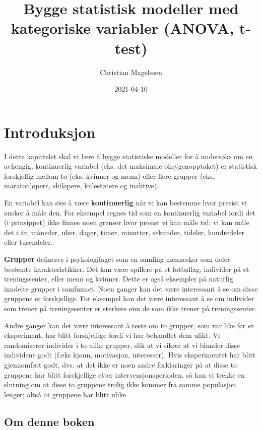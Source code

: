 \documentclass[
]{book}
\title{Bygge statistisk modeller med kategoriske variabler (ANOVA, t-test)}
\author{Christian Magelssen}
\date{2021-04-10}
\begin{document}
\maketitle

{
\setcounter{tocdepth}{1}
\tableofcontents
}
\hypertarget{intro}{%
\chapter{Introduksjon}\label{intro}}

I dette kapittelet skal vi lære å bygge statistiske modeller for å undersøke om en avhengig, kontinuerlig variabel (eks. det maksimale oksygenopptaket) er statistisk forskjellig mellom to (eks. kvinner og menn) eller flere grupper (eks. maratonløpere, skiløpere, kulestøtere og inaktive).

En variabel kan sies å være \textbf{kontinuerlig} når vi kan bestemme hvor presist vi ønsker å måle den. For eksempel regnes tid som en kontinuerlig variabel fordi det (i prinsippet) ikke finnes noen grenser hvor presist vi kan måle tid; vi kan måle det i år, måneder, uker, dager, timer, minutter, sekunder, tideler, hundredeler eller tusendeler.

\textbf{Grupper} defineres i psykologifaget som en samling mennesker som deler bestemte karakteristikker. Det kan være spillere på et fotballag, individer på et treningssenter, eller menn og kvinner. Dette er også eksempler på naturlig inndelte grupper i samfunnet. Noen ganger kan det være interessant å se om disse gruppene er forskjellige. For eksempel kan det være interessant å se om individer som trener på treningssenter er sterkere enn de som ikke trener på treningssenter.

Andre ganger kan det være interessant å teste om to grupper, som var like før et eksperiment, har blitt forskjellige fordi vi har behandlet dem ulikt. Vi randomiserer individer i to ulike grupper, slik at vi sikrer at vi blander disse individene godt (f.eks kjønn, motivasjon, interesser). Hvis eksperimentet har blitt gjennomført godt, dvs. at det ikke er noen andre forklaringer på at disse to gruppene har blitt forskjellige etter intervensjonsperioden, så kan vi trekke en slutning om at disse to gruppene trolig ikke kommer fra samme populasjon lenger; altså at gruppene har blitt ulike.

\hypertarget{om-denne-boken}{%
\section{Om denne boken}\label{om-denne-boken}}
\end{document}
